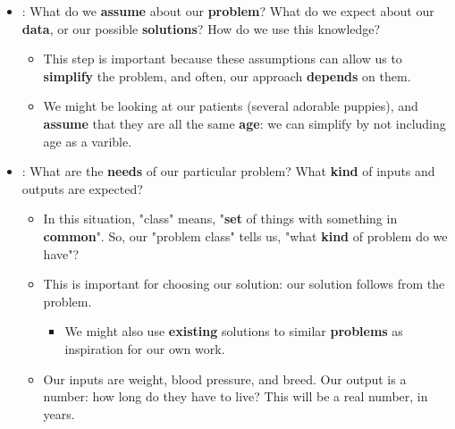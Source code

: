             \begin{itemize}
                \item {}: What do we \textbf{assume} about our \textbf{problem}? What do we expect about our \textbf{data}, or our possible \textbf{solutions}? How do we use this knowledge?
                
                    \begin{itemize}
                        \item This step is important because these assumptions can allow us to \textbf{simplify} the problem, and often, our approach \textbf{depends} on them.
                        
                        \item \miniex We might be looking at our patients (several adorable puppies), and \textbf{assume} that they are all the same \textbf{age}: we can simplify by not including age as a varible.
                    \end{itemize}
                
                \item {}: What are the \textbf{needs} of our particular problem? What \textbf{kind} of inputs and outputs are expected?
                    \begin{itemize}
                        \item In this situation, "class" means, "\textbf{set} of things with something in \textbf{common}". So, our "problem class" tells us, "what \textbf{kind} of problem do we have"? 
                        
                        \item This is important for choosing our solution: our solution follows from the problem.  
                            \begin{itemize}
                                \item We might also use \textbf{existing} solutions to similar \textbf{problems} as inspiration for our own work.
                            \end{itemize}
                            
                        \item \miniex Our inputs are weight, blood pressure, and breed. Our output is a number: how long do they have to live? This will be a real number, in years.
                        

\end{itemize}
\end{itemize}
